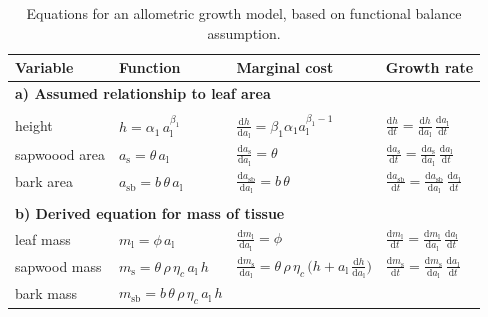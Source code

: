 \documentclass[10pt,twoside]{article}
\begin{document}
\newpage

\begin{table}[ht]
\caption{Equations for an allometric growth model, based on functional balance assumption. }
\centering
  \begin{tabular}{p{2.5cm}p{3.5cm}p{5cm}p{4cm} }\\ \hline
  Variable & Function & Marginal cost & Growth rate\\ \hline
  \multicolumn{4}{l}{\textbf{a) Assumed relationship to leaf area}} \\ \\
  height &
    $h = \alpha_1 \, a_\textrm{l}^{\beta_1}$ &
    $\frac{\textrm{d}h}{\textrm{d}a_\textrm{l}} =  \beta_1 \alpha_1 a_\textrm{l}^{\beta_1-1}$ &
    $\frac{\textrm{d}h}{\textrm{d}t}  = \frac{\textrm{d}h}{\textrm{d}a_\textrm{l}} \, \frac{\textrm{d}a_\textrm{l}}{\textrm{d}t}$ \\
  sapwoood area &
    $a_\textrm{s} = \theta \, a_\textrm{l}$ &
    $\frac{\textrm{d}a_\textrm{s}}{\textrm{d} a_\textrm{l}} = \theta$ &
    $\frac{\textrm{d}a_\textrm{s}}{\textrm{d}t}  =\frac{\textrm{d}a_\textrm{s}}{\textrm{d} a_\textrm{l}} \, \frac{\textrm{d}a_\textrm{l}}{\textrm{d}t}$ \\
  bark area &
    $a_\textrm{sb} = b \, \theta \, a_\textrm{l}$ &
    $\frac{\textrm{d}a_\textrm{sb}}{\textrm{d} a_\textrm{l}} = b \, \theta$ &
    $\frac{\textrm{d}a_\textrm{sb}}{\textrm{d}t} = \frac{\textrm{d}a_\textrm{sb}}{\textrm{d} a_\textrm{l}} \, \frac{\textrm{d}a_\textrm{l}}{\textrm{d}t}$ \\  \\
  \multicolumn{4}{l}{\textbf{b) Derived equation for mass of tissue }} \\
  leaf mass &
    $m_\textrm{l} = \phi \, a_\textrm{l} $ &
    $\frac{\textrm{d}m_\textrm{l}}{\textrm{d}a_\textrm{l}} = \phi$ &
    $\frac{\textrm{d}m_\textrm{l}}{\textrm{d}t}  = \frac{\textrm{d}m_\textrm{l}}{\textrm{d}a_\textrm{l}}  \, \frac{\textrm{d}a_\textrm{l}}{\textrm{d}t}$ \\
  sapwood mass &
    $m_\textrm{s} = \theta \, \rho \, \eta_c \, a_\textrm{l} \, h $ &
    $\frac{\textrm{d}m_\textrm{s}}{\textrm{d}a_\textrm{l}} = \theta\, \rho\, \eta_c\, \big( h + a_\textrm{l}\, \frac{\textrm{d}h}{\textrm{d}a_\textrm{l}} \big)$ &
    $\frac{\textrm{d}m_\textrm{s}}{\textrm{d}t}  = \frac{\textrm{d}m_\textrm{s}}{\textrm{d}a_\textrm{l}} \, \frac{\textrm{d}a_\textrm{l}}{\textrm{d}t}$ \\
  bark mass &
    $m_\textrm{sb} = b\, \theta \, \rho \, \eta_c \, a_\textrm{l} \, h $ &

\end{tabular}
\end{table}
\end{document}
